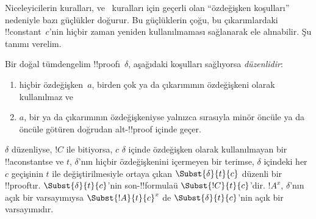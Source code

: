 \documentclass[../../../include/open-logic-section]{subfiles}
\begin{document}


Niceleyicilerin kuralları, \Elim{\lexists} ve~\Intro{\lforall} kuralları
için geçerli olan ``özdeğişken koşulları'' nedeniyle bazı güçlükler doğurur.
Bu güçlüklerin çoğu, bu çıkarımlardaki !!{constant}~$c$'nin hiçbir zaman
yeniden kullanılmaması sağlanarak ele alınabilir. Şu tanımı verelim.

\begin{defn}
Bir doğal tümdengelim !!{proof}{}ı~$\delta$, aşağıdaki koşulları sağlıyorsa
\emph{düzenlidir}:
\begin{enumerate}
  \item hiçbir özdeğişken~$a$, birden çok \Elim{\lexists} ya da
  \Intro{\lforall} çıkarımının özdeğişkeni olarak kullanılmaz ve
  \item $a$, bir \Elim{\lexists} ya da \Intro{\lforall} çıkarımının
  özdeğişkeniyse yalnızca sırasıyla minör öncüle ya da öncüle götüren doğrudan
  alt-!!{proof} içinde geçer.
\end{enumerate}
\end{defn}

\begin{lem} $\delta$ düzenliyse, $!C$ ile
bitiyorsa, $c$ $\delta$ içinde özdeğişken olarak kullanılmayan bir
!!a{constant}{}se ve $t$, $\delta$'nın hiçbir özdeğişkenini içermeyen bir
terimse, $\delta$ içindeki her $c$ geçişinin $t$ ile değiştirilmesiyle ortaya
çıkan $\Subst{\delta}{t}{c}$ düzenli bir !!{proof}{}tır.
$\Subst{\delta}{t}{c}$'nin son-!!{formula}{}ü $\Subst{!C}{t}{c}$'dir.
$!A^x$, $\delta$'nın açık bir varsayımıysa $\Subst{!A}{t}{c}^x$ de
$\Subst{\delta}{t}{c}$'nin açık bir varsayımıdır.
\end{lem}
\end{document}
